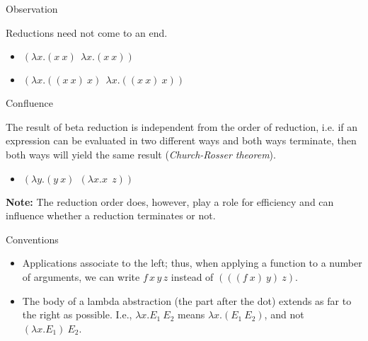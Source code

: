 \documentclass[xcolor=dvipsnames]{beamer}
\begin{document}
\begin{frame}{Observation}

Reductions need not come to an end. 
\begin{itemize}
\item $(\lambda x.(x\ x)\ \ \lambda x.(x\ x))$ %
\item %
      $(\lambda x.((x\ x)\ x)\ \ \lambda x.((x\ x)\ x))$ 
\end{itemize} 
\end{frame}


\begin{frame}{Confluence}

The result of beta reduction is independent from the order of reduction,
i.e. if an expression can be evaluated in two different ways and both 
ways terminate, then both ways will yield the same result 
({\em Church-Rosser theorem}).

\begin{itemize}
\item $(\lambda y.(y\ x)\ \ (\lambda x.x\ \ z))$
\end{itemize}  

\vfill

{\small {\bf Note:} The reduction order does, however, play a role 
for efficiency and can influence whether a reduction terminates or not.}
\end{frame}


\begin{frame}{Conventions}

\begin{itemize}
\item Applications associate to the left; thus, when applying a function to a number 
of arguments, we can write $f\,x\,y\,z$ instead of $(((f\ x)\ y)\ z)$.
\item The body of a lambda abstraction (the part after the dot) extends as far
to the right as possible. I.e., $\lambda x.E_1\ E_2$ means $\lambda x.(E_1\ E_2)$, 
and not $(\lambda x.E_1)\ E_2$.
\end{itemize}
\end{frame}
\end{document}

